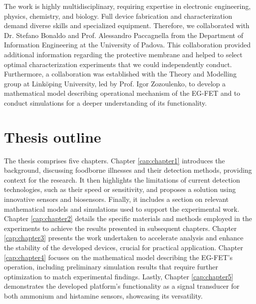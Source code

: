 The work is highly multidisciplinary, requiring expertise in electronic engineering, physics, chemistry, and biology. Full device fabrication and characterization demand diverse skills and specialized equipment. Therefore, we collaborated with Dr. Stefano Bonaldo and Prof. Alessandro Paccagnella from the Department of Information Engineering at the University of Padova. This collaboration provided additional information regarding the protective membrane and helped to select optimal characterization experiments that we could independently conduct. Furthermore, a collaboration was established with the Theory and Modelling group at Linköping University, led by Prof. Igor Zozoulenko, to develop a mathematical model describing operational mechanism of the EG-FET and to conduct simulations for a deeper understanding of its functionality.

\section{Thesis outline}
 
The thesis comprises five chapters. Chapter \ref{cap:chapter1} introduces the background, discussing foodborne illnesses and their detection methods, providing context for the research. It then highlights the limitations of current detection technologies, such as their speed or sensitivity, and proposes a solution using innovative sensors and biosensors. Finally, it includes a section on relevant mathematical models and simulations used to support the experimental work. Chapter \ref{cap:chapter2} details the specific materials and methods employed in the experiments to achieve the results presented in subsequent chapters. Chapter \ref{cap:chapter3} presents the work undertaken to accelerate analysis and enhance the stability of the developed devices, crucial for practical application. Chapter \ref{cap:chapter4} focuses on the mathematical model describing the EG-FET's operation, including preliminary simulation results that require further optimization to match experimental findings. Lastly, Chapter \ref{cap:chapter5} demonstrates the developed platform's functionality as a signal transducer for both ammonium and histamine sensors, showcasing its versatility.

\newpage
\thispagestyle{empty}
\ %
\newpage